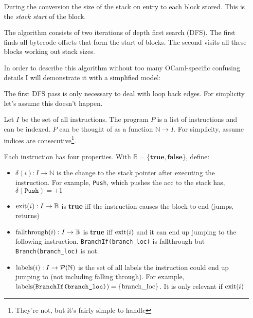 During the conversion the size of the stack on entry to each block stored. This is the \emph{stack
      start} of the block.


The algorithm consists of two iterations of depth first search (DFS). The first finds all bytecode
offsets that form the start of blocks. The second visits all these blocks working out stack sizes.

In order to describe this algorithm without too many OCaml-specific confusing details I will
demonstrate it with
a simplified model:

The first DFS pass is only necessary to deal with loop back edges. For simplicity let's assume this
doesn't happen.

Let \(I\) be the set of all instructions. The program \(P\) is a list of instructions and can be
indexed. \(P\) can be thought of as a function \(\mathbb{N} \to I\).
For simplicity, assume indices are consecutive\footnote{They're not, but it's fairly simple to
      handle}.

Each instruction has four properties. With $\mathbb{B} = \{ \textbf{true}, \textbf{false} \}$,
define:

\begin{itemize}
      \item \(\delta(i) : I \to \mathbb{N} \) is the change to the stack pointer after executing
            the
            instruction. For
            example, \texttt{Push}, which pushes the acc to the stack has, \(\delta(\texttt{Push})
            =
            +1\)
      \item \(\operatorname{exit}(i) : I \to \mathbb{B} \) is \textbf{true} iff the instruction causes
            the block to end
            (jumps, returns)
      \item \(\operatorname{fallthrough}(i) : I \to \mathbb{B} \) is \textbf{true} iff \(\operatorname{exit}(i)\)
            and it can end up
            jumping to the following instruction. \texttt{BranchIf(branch\_loc)} is fallthrough but
            \texttt{Branch(branch\_loc)} is not.
      \item \(\operatorname{labels}(i) : I \to \mathcal{P}(\mathbb{N}) \) is the set of all labels the
            instruction could end up jumping to
            (not
            including falling through). For example, \(\operatorname{labels}(\texttt{BranchIf(branch\_loc)}) =
            \{\text{branch\_loc}\}\). It is only relevant if \(\operatorname{exit}(i)\)
\end{itemize}

